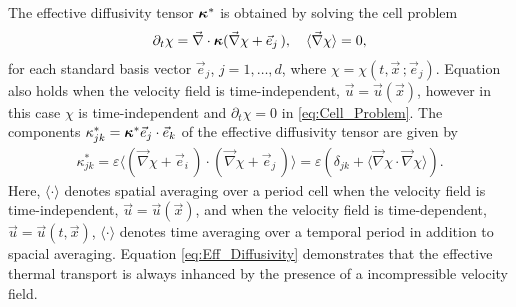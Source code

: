 \documentclass[11pt]{amsart}
\newcommand{\Hb}{\mathbf{H}}
\newcommand{\Ib}{\mathbf{I}}
\newcommand\bkappa{\mbox{\boldmath${\kappa}$}}
\begin{document}
The effective diffusivity tensor $\bkappa^*$ is
obtained by solving the cell problem \cite{Fannjiang:SIAM_JAM:333}
%
\begin{align}\label{eq:Cell_Problem}
  \partial_t\chi=\vec{\nabla}\cdot\bkappa(\vec{\nabla}\chi+\vec{e}_j\,), \quad
  \langle\vec{\nabla}\chi\rangle=0,
\end{align}
%
for each standard basis vector $\vec{e}_j$, $j=1,\ldots,d$, where
$\chi=\chi(t,\vec{x}\,;\vec{e}_j)$. Equation also holds
\cite{Fannjiang:SIAM_JAM:333} when the velocity field is
time-independent, $\vec{u}=\vec{u}(\vec{x})$, however in this case $\chi$ 
is time-independent and $\partial_t\chi=0$ in \eqref{eq:Cell_Problem}.  The 
components $\kappa^*_{jk}=\bkappa^*\vec{e}_j\cdot\vec{e}_k$ of the effective
diffusivity tensor are given by \cite{Fannjiang:SIAM_JAM:333} 
% 
\begin{align}\label{eq:Eff_Diffusivity}  
   \kappa^*_{jk}=\varepsilon\langle(\vec{\nabla}\chi+\vec{e}_i\,)\cdot(\vec{\nabla}\chi+\vec{e}_j\,)\rangle
       =\varepsilon(\delta_{jk}+\langle\vec{\nabla}\chi\cdot\vec{\nabla}\chi\rangle).
\end{align}
Here, $\langle\cdot\rangle$ denotes spatial averaging over a period cell when the
velocity field is time-independent, $\vec{u}=\vec{u}(\vec{x})$, and
when the velocity field is time-dependent, $\vec{u}=\vec{u}(t,\vec{x})$,
$\langle\cdot\rangle$ denotes time averaging over a temporal period in addition to
spacial averaging. Equation \eqref{eq:Eff_Diffusivity} demonstrates
that the effective thermal transport is always inhanced by the
presence of a incompressible velocity field. 
\end{document}
